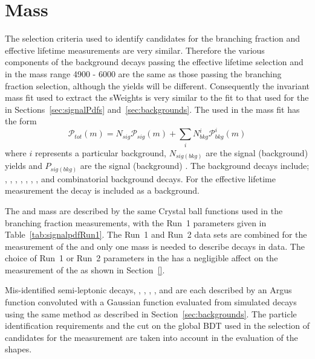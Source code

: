 \section{Mass \pdfs}
\label{sec:ELmasspdfs}
The selection criteria used to identify \bsmumu candidates for the \bmumu branching fraction and \bsmumu effective lifetime measurements are very similar. 
Therefore the various components of the background decays passing the \bsmumu effective lifetime selection and in the mass range 4900 - 6000 \mevcc are the same as those passing the branching fraction selection, although the yields will be different.%
Consequently the invariant mass fit used to extract the sWeights is very similar to the fit to that used for the \BFm in Sections~\ref{sec:signalPdfs} and~\ref{sec:backgrounds}. The \pdf used in the mass fit has the form
\begin{equation}
\mathcal{P}_{tot}(m) = N_{sig}\mathcal{P}_{sig}(m) + \displaystyle\sum_{i} N^i_{bkg}\mathcal{P}^i_{bkg}(m)
\label{eq:masspdf}
\end{equation}
where $i$ represents a particular background, $N_{sig(bkg)}$ are the signal (background) yields and $P_{sig(bkg)}$ are the signal (background) \pdfs. The background decays include; \bdmumu, \bhh, \lambdab, \bdpimunu, \bsKmunu, \bupimumu, \bdpimumu, \bcjpsimunu and combinatorial background decays. For the effective lifetime measurement the \bdmumu decay is included as a background. 



The \bsmumu and \bdmumu mass \pdfs are described by the same Crystal ball functions used in the branching fraction measurements, with the Run~1 parameters given in Table~\ref{tab:signalpdfRun1}. The Run~1 and Run~2 data sets are combined for the measurement of the \bsmumu \el and only one mass \pdf is needed to describe \bmumu decays in data. The choice of Run~1 or Run~2 parameters in the \pdf has a negligible affect on the measurement of the \bsmumu \el as shown in Section~\ref{}.

Mis-identified semi-leptonic decays, \lambdab, \bdpimunu, \bsKmunu, \bupimumu, \bdpimumu and \bcjpsimunu are each described by an Argus function convoluted with a Gaussian function evaluated from simulated decays using the same method as described in Section~\ref{sec:backgrounds}. The particle identification requirements and the cut on the global BDT used in the selection of candidates for the \el measurement are taken into account in the evaluation of the \pdf shapes. %

